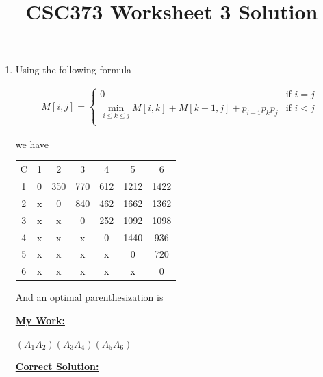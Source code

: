\documentclass[12pt]{article}
\begin{document}
\title{CSC373 Worksheet 3 Solution}
\maketitle

\bigskip

\begin{enumerate}[1.]
    \item

    Using the following formula

    \begin{align}
        M[i,j] = \begin{cases}
            0 & \text{if $i = j$}\\
            \min_{i \leq k \leq j} M[i,k] + M[k+1,j] + p_{i-1}p_{k}p_j & \text{if $i < j$}\\
        \end{cases}
    \end{align}

    we have

    \begin{center}
        \begin{tabular}{|c|c|c|c|c|c|c|}
            \hline
            C & 1 & 2 & 3 & 4 & 5 & 6\\
            1 & 0 & 350 & 770 & 612 & 1212 & 1422\\
            2 & x & 0 & 840 & 462 & 1662 & 1362\\
            3 & x & x & 0 & 252 & 1092 & 1098\\
            4 & x & x & x & 0 & 1440 & 936\\
            5 & x & x & x & x & 0 & 720\\
            6 & x & x & x & x & x & 0\\
            \hline
        \end{tabular}
    \end{center}

    \bigskip

    And an optimal parenthesization is

    \begin{mdframed}
        \underline{\textbf{My Work:}}

        \bigskip

        $(A_1A_2)(A_3A_4)(A_5A_6)$
    \end{mdframed}

    \bigskip

    \begin{mdframed}
        \underline{\textbf{Correct Solution:}}


\end{mdframed}
\end{enumerate}
\end{document}
